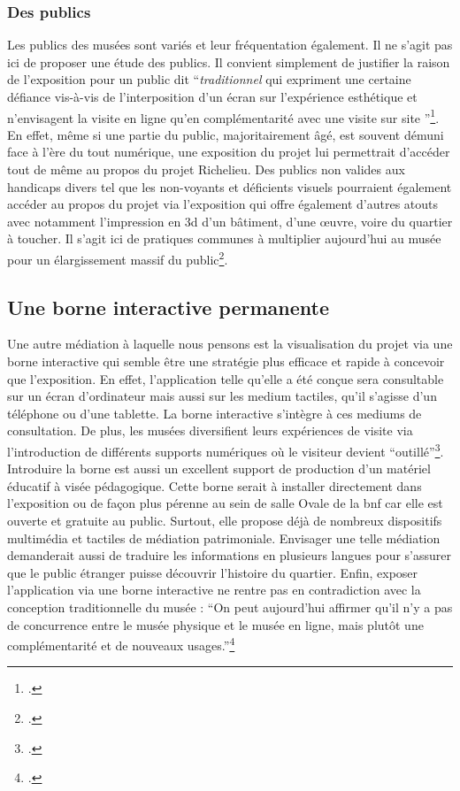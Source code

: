 \subsubsection{Des publics}
Les publics des musées sont variés et leur fréquentation également. Il ne s'agit pas ici de proposer une étude des publics. Il convient simplement de justifier la raison de l'exposition pour un public dit \enquote{\textit{traditionnel} qui expriment une certaine défiance vis-à-vis de l’interposition d’un écran sur l’expérience esthétique et n’envisagent la visite en ligne qu’en complémentarité avec une visite sur site }\footcite{BADULESCUpublics2023}. En effet, même si une partie du public, majoritairement âgé, est souvent démuni face à l'ère du tout numérique, une exposition du projet lui permettrait d'accéder tout de même au propos du projet Richelieu. Des publics non valides aux handicaps divers tel que les non-voyants et déficients visuels pourraient également accéder au propos du projet via l'exposition qui offre également d'autres atouts avec notamment l'impression en \acrshort{3d} d'un bâtiment, d'une œuvre, voire du quartier à toucher. Il s'agit ici de pratiques communes à multiplier aujourd'hui au musée pour un élargissement massif du public\footcite{WINDHAGERVisualizing2018}. 

\subsection{Une borne interactive permanente}
Une autre médiation à laquelle nous pensons est la visualisation du projet via une borne interactive qui semble être une stratégie plus efficace et rapide à concevoir que l'exposition. En effet, l'application telle qu'elle a été conçue sera consultable sur un écran d'ordinateur mais aussi sur les medium tactiles, qu'il s'agisse d'un téléphone ou d'une tablette. La borne interactive s'intègre à ces mediums de consultation. De plus, les musées diversifient leurs expériences de visite via l'introduction de différents supports numériques où le visiteur devient \enquote{outillé}\footcite{BADULESCUpublics2023}.
Introduire la borne est aussi un excellent support de production d'un matériel éducatif à visée pédagogique. Cette borne serait à installer directement dans l'exposition ou de façon plus pérenne au sein de salle Ovale de la \acrshort{bnf} car elle est ouverte et gratuite au public. Surtout, elle propose déjà de nombreux dispositifs multimédia et tactiles de médiation patrimoniale. Envisager une telle médiation demanderait aussi de traduire les informations en plusieurs langues pour s'assurer que le public étranger puisse découvrir l'histoire du quartier. 
Enfin, exposer l'application via une borne interactive ne rentre pas en contradiction avec la conception traditionnelle du musée : \enquote{On peut aujourd’hui affirmer qu’il n’y a pas de  concurrence entre le musée physique et le musée en ligne, mais plutôt une complémentarité et de nouveaux usages.}\footcite{DELMAS-GLASSHumanites2021} 

